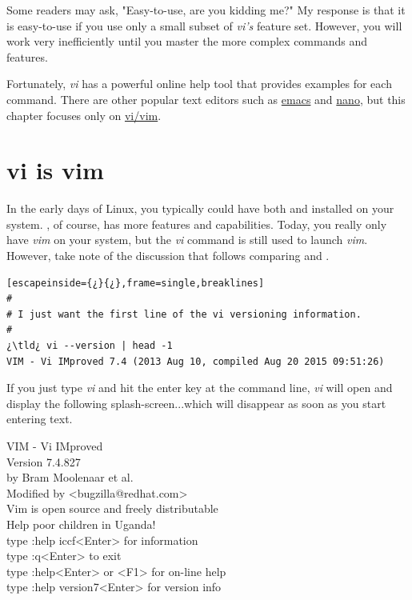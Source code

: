 Some readers may ask, "Easy-to-use, are you kidding me?" My response is that it is easy-to-use if you use only a small subset of \emph{vi's} feature set. However, you will work very inefficiently until you master the more complex commands and features.

Fortunately, \emph{vi} has a powerful online help tool that provides examples for each command. There are other popular text editors such as \href{https://www.gnu.org/software/emacs/}{emacs} and \href{http://www.nano-editor.org/}{nano}, but this chapter focuses only on \href{http://vim.wikia.com/wiki/Vim_Tips_Wiki}{vi/vim}.

\section{vi is vim}
In the early days of Linux, you typically could have both  and  installed on your system. , of course, has more features and capabilities. Today, you really only have \emph{vim} on your system, but the \emph{vi} command is still used to launch \emph{vim}. However, take note of the discussion that follows comparing  and .

\begin{lstlisting}[escapeinside={¿}{¿},frame=single,breaklines]
#
# I just want the first line of the vi versioning information.
#
¿\tld¿ vi --version | head -1
VIM - Vi IMproved 7.4 (2013 Aug 10, compiled Aug 20 2015 09:51:26)
\end{lstlisting}

If you just type \emph{vi} and hit the enter key at the command line, \emph{vi} will open and display the following splash-screen...which will disappear as soon as you start entering text.

\begin{center}
VIM - Vi IMproved\\
Version 7.4.827\\                                                 
by Bram Moolenaar et al.\\                                               
Modified by <bugzilla@redhat.com>\\                                       
Vim is open source and freely distributable\\                                     

Help poor children in Uganda!\\                                            
type  :help iccf<Enter>       for information\\                                     

type  :q<Enter>               to exit\\                                             
type  :help<Enter>  or  <F1>  for on-line help\\                                    
type  :help version7<Enter>   for version info \\    
\end{center}

